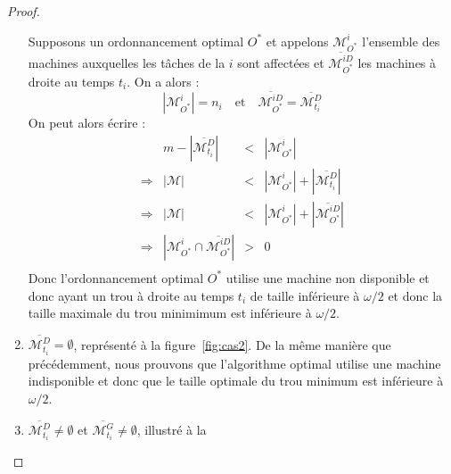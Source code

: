 \documentclass[a4paper,9pt]{article}
\begin{document}
\begin{proof}
\begin{bitemize}
\begin{enumerate}
                    Supposons un ordonnancement optimal $O^*$ et appelons
                    $\mathcal{M}_{O^*}^i$ l'ensemble des machines auxquelles les tâches de la
                    \tphase{} $i$ sont affectées et $\overline{\mathcal{M}_{O^*}^{iD}}$ les machines
                     à droite au temps $t_i$. On a alors :
                    \begin{displaymath}
                        |\mathcal{M}_{O^*}^i| = n_i \quad \mbox{et} \quad
                        \overline{\mathcal{M}_{O^*}^{iD}} = \overline{\mathcal{M}_{t_i}^D}
                    \end{displaymath}
                    On peut alors écrire :
                    \begin{displaymath}
                        \begin{array}{rrcl}
                            & m - |\overline{\mathcal{M}_{t_i}^D}| & < & |\mathcal{M}_{O^*}^i| \\
                            \Rightarrow & |\mathcal{M}| & < & |\mathcal{M}_{O^*}^i| +
                            |\overline{\mathcal{M}_{t_i}^D}| \\
                            \Rightarrow & |\mathcal{M}| & < & |\mathcal{M}_{O^*}^i| +
                            |\overline{\mathcal{M}_{O^*}^{iD}}| \\
                            \Rightarrow & |\mathcal{M}_{O^*}^i \cap
                            \overline{\mathcal{M}_{O^*}^{iD}}| & > & 0 \\
                        \end{array}
                    \end{displaymath}
                    Donc l'ordonnancement optimal $O^*$ utilise une machine non disponible et donc
                    ayant un trou à droite au temps $t_i$ de taille inférieure à $\omega / 2$ et
                    donc la taille maximale du trou minimimum est inférieure à
                    $\omega/2$.
                \item $\overline{\mathcal{M}_{t_i}^D} = \emptyset$, représenté à la
                    figure~\ref{fig:cas2}. De la même manière que précédemment, nous prouvons que
                    l'algorithme optimal utilise une machine indisponible et donc que le taille
                    optimale du trou minimum est inférieure à $\omega / 2$.
                \item $\overline{\mathcal{M}_{t_i}^D} \neq \emptyset$ et
                    $\overline{\mathcal{M}_{t_i}^G} \neq \emptyset$, illustré à la

\end{enumerate}
\end{bitemize}
\end{proof}
\end{document}
